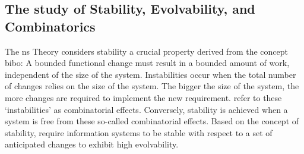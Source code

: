 \subsection{The study of Stability, Evolvability, and Combinatorics} \label{subsec_on_stability}

The \gls{ns} Theory considers stability a crucial property derived from the concept
\gls{bibo}: A bounded functional change must result in a bounded amount of work,
independent of the size of the system. Instabilities occur when the total number of
changes relies on the size of the system. The bigger the size of the system, the more
changes are required to implement the new requirement.
\textcite[271]{mannaert_normalized_2016} refer to these \enquote*{instabilities} as
combinatorial effects. Conversely, stability is achieved when a system is free from these
so-called combinatorial effects. Based on the concept of stability,
\textcite{mannaert_towards_2012} require information systems to be stable with respect to
a set of anticipated changes to exhibit high evolvability.